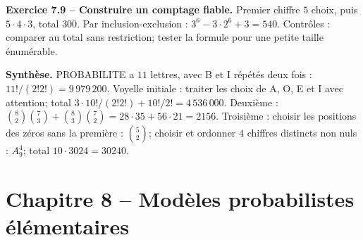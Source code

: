 \begin{answerbox}
\textbf{Exercice 7.9 -- Construire un comptage fiable.} Premier chiffre $5$ choix, puis $5\cdot4\cdot3$, total $300$. Par inclusion-exclusion : $3^6-3\cdot2^6+3=540$. Contrôles : comparer au total sans restriction; tester la formule pour une petite taille énumérable.\par
\medskip\textbf{Synthèse.} PROBABILITE a $11$ lettres, avec B et I répétés deux fois : $11!/(2!2!)=9\,979\,200$. Voyelle initiale : traiter les choix de A, O, E et I avec attention; total $3\cdot10!/(2!2!)+10!/2!=4\,536\,000$. Deuxième : $\binom82\binom73+\binom83\binom72=28\cdot35+56\cdot21=2156$. Troisième : choisir les positions des zéros sans la première : $\binom52$; choisir et ordonner $4$ chiffres distincts non nuls : $A_9^4$; total $10\cdot3024=30240$.
\end{answerbox}
\chapter*{Chapitre 8 -- Modèles probabilistes élémentaires}
